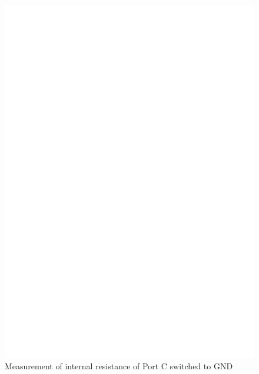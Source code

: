 \begin{enumerate}
\begin{figure}[H]
\includegraphics[]{../FIG/Test7.eps}
\caption{Measurement of internal resistance of Port C switched to GND }
\label{fig:test7}
\end{figure}


\end{enumerate}
